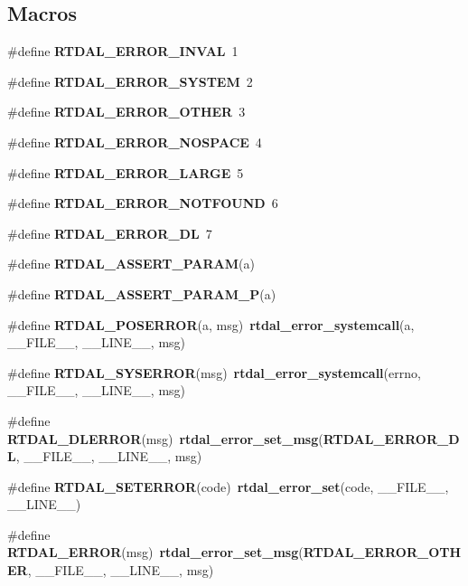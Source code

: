 \subsection*{Macros}
\begin{DoxyCompactItemize}
\item 
\#define {\bf R\-T\-D\-A\-L\-\_\-\-E\-R\-R\-O\-R\-\_\-\-I\-N\-V\-A\-L}~1
\item 
\#define {\bf R\-T\-D\-A\-L\-\_\-\-E\-R\-R\-O\-R\-\_\-\-S\-Y\-S\-T\-E\-M}~2
\item 
\#define {\bf R\-T\-D\-A\-L\-\_\-\-E\-R\-R\-O\-R\-\_\-\-O\-T\-H\-E\-R}~3
\item 
\#define {\bf R\-T\-D\-A\-L\-\_\-\-E\-R\-R\-O\-R\-\_\-\-N\-O\-S\-P\-A\-C\-E}~4
\item 
\#define {\bf R\-T\-D\-A\-L\-\_\-\-E\-R\-R\-O\-R\-\_\-\-L\-A\-R\-G\-E}~5
\item 
\#define {\bf R\-T\-D\-A\-L\-\_\-\-E\-R\-R\-O\-R\-\_\-\-N\-O\-T\-F\-O\-U\-N\-D}~6
\item 
\#define {\bf R\-T\-D\-A\-L\-\_\-\-E\-R\-R\-O\-R\-\_\-\-D\-L}~7
\item 
\#define {\bf R\-T\-D\-A\-L\-\_\-\-A\-S\-S\-E\-R\-T\-\_\-\-P\-A\-R\-A\-M}(a)
\item 
\#define {\bf R\-T\-D\-A\-L\-\_\-\-A\-S\-S\-E\-R\-T\-\_\-\-P\-A\-R\-A\-M\-\_\-\-P}(a)
\item 
\#define {\bf R\-T\-D\-A\-L\-\_\-\-P\-O\-S\-E\-R\-R\-O\-R}(a, msg)~{\bf rtdal\-\_\-error\-\_\-systemcall}(a, \-\_\-\-\_\-\-F\-I\-L\-E\-\_\-\-\_\-, \-\_\-\-\_\-\-L\-I\-N\-E\-\_\-\-\_\-, msg)
\item 
\#define {\bf R\-T\-D\-A\-L\-\_\-\-S\-Y\-S\-E\-R\-R\-O\-R}(msg)~{\bf rtdal\-\_\-error\-\_\-systemcall}(errno, \-\_\-\-\_\-\-F\-I\-L\-E\-\_\-\-\_\-, \-\_\-\-\_\-\-L\-I\-N\-E\-\_\-\-\_\-, msg)
\item 
\#define {\bf R\-T\-D\-A\-L\-\_\-\-D\-L\-E\-R\-R\-O\-R}(msg)~{\bf rtdal\-\_\-error\-\_\-set\-\_\-msg}({\bf R\-T\-D\-A\-L\-\_\-\-E\-R\-R\-O\-R\-\_\-\-D\-L}, \-\_\-\-\_\-\-F\-I\-L\-E\-\_\-\-\_\-, \-\_\-\-\_\-\-L\-I\-N\-E\-\_\-\-\_\-, msg)
\item 
\#define {\bf R\-T\-D\-A\-L\-\_\-\-S\-E\-T\-E\-R\-R\-O\-R}(code)~{\bf rtdal\-\_\-error\-\_\-set}(code, \-\_\-\-\_\-\-F\-I\-L\-E\-\_\-\-\_\-, \-\_\-\-\_\-\-L\-I\-N\-E\-\_\-\-\_\-)
\item 
\#define {\bf R\-T\-D\-A\-L\-\_\-\-E\-R\-R\-O\-R}(msg)~{\bf rtdal\-\_\-error\-\_\-set\-\_\-msg}({\bf R\-T\-D\-A\-L\-\_\-\-E\-R\-R\-O\-R\-\_\-\-O\-T\-H\-E\-R}, \-\_\-\-\_\-\-F\-I\-L\-E\-\_\-\-\_\-, \-\_\-\-\_\-\-L\-I\-N\-E\-\_\-\-\_\-, msg)
\end{DoxyCompactItemize}
